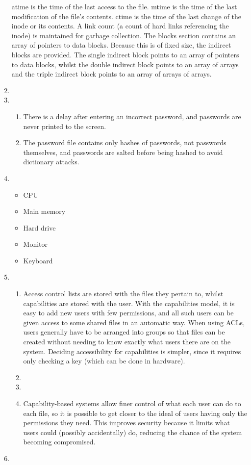 \documentclass[11pt]{article}
\begin{document}
\begin{enumerate}
  atime is the time of the last access to the file. mtime is the time of the last modification of the file's contents. ctime is the time of the last change of the inode or its contents. A link count (a count of hard links referencing the inode) is maintained for garbage collection. The blocks section contains an array of pointers to data blocks. Because this is of fixed size, the indirect blocks are provided. The single indirect block points to an array of pointers to data blocks, whilst the double indirect block points to an array of arrays and the triple indirect block points to an array of arrays of arrays.
\item
\item
  \begin{enumerate}
  \item There is a delay after entering an incorrect password, and passwords are never printed to the screen.
  \item The password file contains only hashes of passwords, not passwords themselves, and passwords are salted before being hashed to avoid dictionary attacks.
  \end{enumerate}
\item
  \begin{itemize}
  \item CPU
  \item Main memory
  \item Hard drive
  \item Monitor
  \item Keyboard
  \end{itemize}
\item
  \begin{enumerate}
  \item Access control lists are stored with the files they pertain to, whilst capabilities are stored with the user. With the capabilities model, it is easy to add new users with few permissions, and all such users can be given access to some shared files in an automatic way. When using ACLs, users generally have to be arranged into groups so that files can be created without needing to know exactly what users there are on the system. Deciding accessibility for capabilities is simpler, since it requires only checking a key (which can be done in hardware).
  \item
  \item
  \item Capability-based systems allow finer control of what each user can do to each file, so it is possible to get closer to the ideal of users having only the permissions they need. This improves security because it limits what users could (possibly accidentally) do, reducing the chance of the system becoming compromised.
  \end{enumerate}
\item
\end{enumerate}
\end{document}

